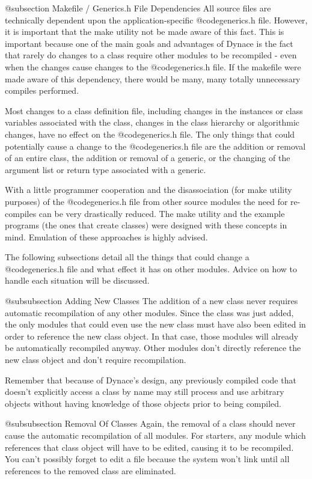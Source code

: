 @subsection Makefile / Generics.h File Dependencies
All source files are technically dependent upon the application-specific
@code{generics.h} file.  However, it is important that the make utility
not be made aware of this fact.  This is important because one of the main
goals and advantages of Dynace is the fact that rarely do changes to a class
require other modules to be recompiled - even when the changes
cause changes to the @code{generics.h} file.  If the makefile were
made aware of this dependency, there would be many, many totally
unnecessary compiles performed.

Most changes to a class definition file, including changes in the
instances or class variables associated with the class, changes in the
class hierarchy or algorithmic changes, have no effect on the
@code{generics.h} file.  The only things that could potentially cause a
change to the @code{generics.h} file are the addition or removal of an
entire class, the addition or removal of a generic, or the changing of
the argument list or return type associated with a generic.

With a little programmer cooperation and the disassociation (for make
utility purposes) of the @code{generics.h} file from other source
modules the need for re-compiles can be very drastically reduced.  The
make utility and the example programs (the ones that create
classes) were designed with these concepts in mind.  Emulation of
these approaches is highly advised.

The following subsections detail all the things that could change
a @code{generics.h} file and what effect it has on other modules.
Advice on how to handle each situation will be discussed.

@subsubsection Adding New Classes
The addition of a new class never requires automatic recompilation
of any other modules.  Since the class was just added, the only modules
that could even use the new class must have also been edited in
order to reference the new class object.  In that case, those modules
will already be automatically recompiled anyway.  Other modules
don't directly reference the new class object and don't require
recompilation.

Remember that because of Dynace's design, any previously compiled code
that doesn't explicitly access a class by name may still process
and use arbitrary objects without having knowledge of those objects
prior to being compiled.

@subsubsection Removal Of Classes
Again, the removal of a class should never cause the automatic
recompilation of all modules.  For starters, any module which
references that class object will have to be edited, causing it to
be recompiled.  You can't possibly forget to edit a file because
the system won't link until all references to the removed class
are eliminated.

